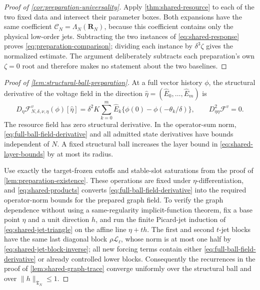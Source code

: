 \begin{proof}[Proof of \cref{cor:preparation-universality}]
Apply \cref{thm:shared-resource} to each of the two fixed data and intersect
their parameter boxes.  Both expansions have the same coefficient
\(\mathscr C_N=\Lambda_N(\mathbf R_N)\), because this coefficient contains
only the physical low-order jets.  Subtracting the two instances of
\cref{eq:shared-response} proves \cref{eq:preparation-comparison}; dividing
each instance by \(\delta^3\zeta\) gives the normalized estimate.  The
argument deliberately subtracts each preparation's own \(\zeta=0\) root and
therefore makes no statement about the two baselines.
\end{proof}

\begin{proof}[Proof of \cref{lem:structural-ball-preparation}]
At a full vector history \(\phi\), the structural derivative of the voltage
field in the direction
\(\widehat\eta=(\widehat E_0,\ldots,\widehat E_m)\) is
\begin{equation}
 D_\eta\mathcal F^v_{N,\delta,\nu,\eta}(\phi)
       [\widehat\eta]
 =\delta^2K\sum_{k=0}^m\widehat E_k
       \{\phi(0)-\phi(-\theta_k/\delta)\},
 \qquad D_{\eta\eta}^2\mathcal F^v=0.                \label{eq:full-ball-field-derivative}
\end{equation}
The resource field has zero structural derivative.  In the operator-sum norm,
\cref{eq:full-ball-field-derivative} and all admitted state derivatives have
bounds independent of \(N\).  A fixed structural ball increases the layer
bound in \cref{eq:shared-layer-bounds} by at most its radius.

Use exactly the target-frozen cutoffs and stable-slot saturations from the
proof of \cref{lem:preparation-existence}.  These operations are fixed under
\(\eta\)-differentiation, and \cref{eq:shared-products} converts
\cref{eq:full-ball-field-derivative} into the required operator-norm bounds
for the prepared graph field.  To verify the graph dependence without using
a same-regularity implicit-function theorem, fix a base point \(\eta\) and a
unit direction \(h\), and run the finite Picard-jet induction of
\cref{eq:shared-jet-triangle} on the affine line \(\eta+th\).  The first and
second \(t\)-jet blocks have the same last diagonal block
\(\rho\mathscr L_\ell\), whose norm is at most one half by
\cref{eq:shared-jet-block-inverse}; all new forcing terms contain either
\cref{eq:full-ball-field-derivative} or already controlled lower blocks.
Consequently the recurrences in the proof of
\cref{lem:shared-graph-trace} converge uniformly over the structural ball and
over \(\|h\|_{\mathfrak T_N}\le1\).


\end{proof}
